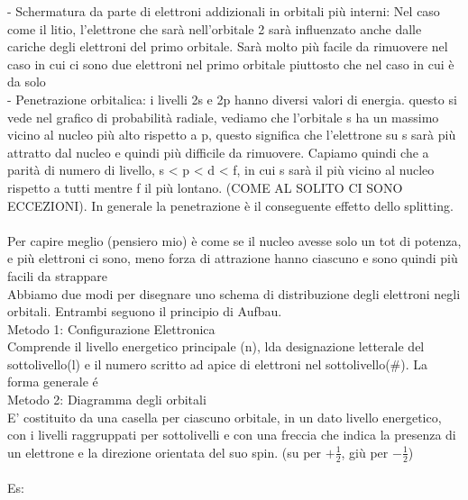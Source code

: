\tab- Schermatura da parte di elettroni addizionali in orbitali più interni: Nel caso come il litio, l’elettrone che sarà nell'orbitale 2 sarà influenzato anche dalle cariche degli elettroni del primo orbitale. Sarà molto più facile da rimuovere nel caso in cui ci sono due elettroni nel primo orbitale piuttosto che nel caso in cui è da solo\\
\tab- Penetrazione orbitalica: i livelli 2s e 2p hanno diversi valori di energia. questo si vede nel grafico di probabilità radiale, vediamo che l’orbitale s ha un massimo vicino al nucleo più alto rispetto a p, questo significa che l’elettrone su s sarà più attratto dal nucleo e quindi più difficile da rimuovere. Capiamo quindi che a parità di numero di livello, s < p < d < f, in cui s sarà il più vicino al nucleo rispetto a tutti mentre f il più lontano. (COME AL SOLITO CI SONO ECCEZIONI). In generale la penetrazione è il conseguente effetto dello splitting.\\\\
Per capire meglio (pensiero mio) è come se il nucleo avesse solo un tot di potenza, e più elettroni ci sono, meno forza di attrazione hanno ciascuno e sono quindi più facili da strappare\\
Abbiamo due modi per disegnare uno schema di distribuzione degli elettroni negli orbitali.  Entrambi seguono il principio di Aufbau. \\
Metodo 1: Configurazione Elettronica\\
Comprende il livello energetico principale (n), lda designazione letterale del sottolivello(l) e il numero scritto ad apice di elettroni nel sottolivello(\#). La forma generale é \\
Metodo 2: Diagramma degli orbitali\\
E’ costituito da una casella per ciascuno orbitale, in un dato livello energetico, con i livelli raggruppati per sottolivelli e con una freccia che indica la presenza di un elettrone e la direzione orientata del suo spin. (su per $+\frac{1}{2}$, giù per $-\frac{1}{2}$)\\\\
Es:\\
